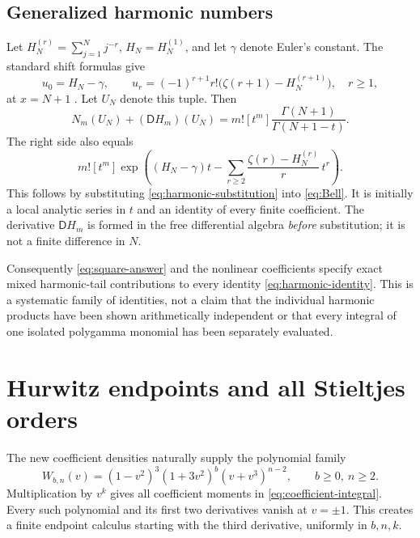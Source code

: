 \documentclass[11pt]{article}
\numberwithin{equation}{section}
\theoremstyle{definition}\newtheorem{definition}[theorem]{Definition}
\theoremstyle{remark}\newtheorem{remark}[theorem]{Remark}
\newcommand{\D}{\mathsf D}\newcommand{\Euler}{\mathscr E}
\begin{document}
\subsection{Generalized harmonic numbers}
Let $H_N^{(r)}=\sum_{j=1}^Nj^{-r}$, $H_N=H_N^{(1)}$, and let
$\gamma$ denote Euler's constant. The standard shift formulas give
\begin{equation}\label{eq:harmonic-substitution}
 u_0=H_N-\gamma,\qquad
 u_r=(-1)^{r+1}r!\bigl(\zeta(r+1)-H_N^{(r+1)}\bigr),\quad r\ge1,
\end{equation}
at $x=N+1$ \cite{DLMF5,DLMF25}. Let $U_N$ denote this tuple. Then
\begin{equation}\label{eq:harmonic-identity}
 N_m(U_N)+(\D H_m)(U_N)
 =m![t^m]\frac{\Gamma(N+1)}{\Gamma(N+1-t)}.
\end{equation}
The right side also equals
\begin{equation}\label{eq:harmonic-generator}
 m![t^m]\exp\left((H_N-\gamma)t-
 \sum_{r\ge2}\frac{\zeta(r)-H_N^{(r)}}r\,t^r\right).
\end{equation}
This follows by substituting \eqref{eq:harmonic-substitution} into
\eqref{eq:Bell}. It is initially a local analytic series in $t$ and an
identity of every finite coefficient. The derivative $\D H_m$ is formed
in the free differential algebra \emph{before} substitution; it is not a
finite difference in $N$.

Consequently \eqref{eq:square-answer} and the nonlinear coefficients
specify exact mixed harmonic-tail contributions to every identity
\eqref{eq:harmonic-identity}. This is a systematic family of identities,
not a claim that the individual harmonic products have been shown
arithmetically independent or that every integral of one isolated
polygamma monomial has been separately evaluated.


\section{Hurwitz endpoints and all Stieltjes orders}
\label{sec:hurwitz}

The new coefficient densities naturally supply the polynomial family
\begin{equation}\label{eq:Wkernel}
 W_{b,n}(v)=(1-v^2)^3(1+3v^2)^b(v+v^3)^{n-2},
 \qquad b\ge0,\ n\ge2.
\end{equation}
Multiplication by $v^k$ gives all coefficient moments in
\eqref{eq:coefficient-integral}. Every such polynomial and its first two
derivatives vanish at $v=\pm1$. This creates a finite endpoint calculus
starting with the third derivative, uniformly in $b,n,k$.
\end{document}
